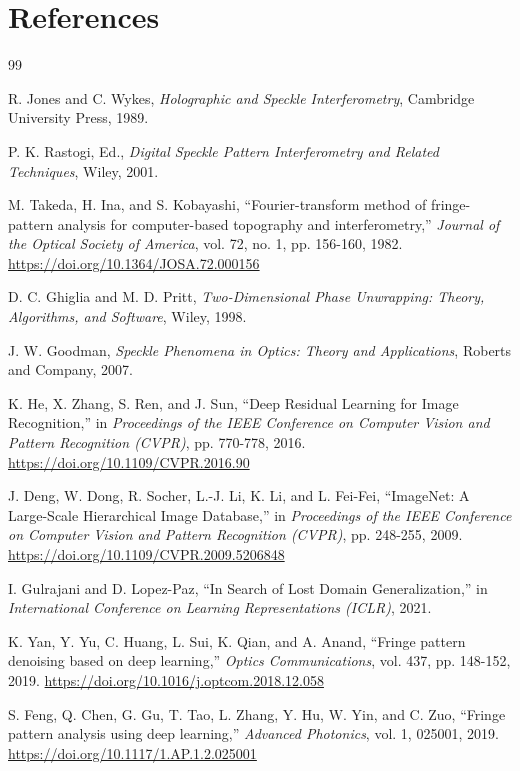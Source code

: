 \documentclass[review,3p,times]{elsarticle}
\begin{document}
\section*{References}
\begin{thebibliography}{99}

 R. Jones and C. Wykes, \emph{Holographic and Speckle Interferometry}, Cambridge University Press, 1989.

 P. K. Rastogi, Ed., \emph{Digital Speckle Pattern Interferometry and Related Techniques}, Wiley, 2001.

 M. Takeda, H. Ina, and S. Kobayashi, ``Fourier-transform method of fringe-pattern analysis for computer-based topography and interferometry,'' \emph{Journal of the Optical Society of America}, vol. 72, no. 1, pp. 156-160, 1982. \url{https://doi.org/10.1364/JOSA.72.000156}

 D. C. Ghiglia and M. D. Pritt, \emph{Two-Dimensional Phase Unwrapping: Theory, Algorithms, and Software}, Wiley, 1998.

 J. W. Goodman, \emph{Speckle Phenomena in Optics: Theory and Applications}, Roberts and Company, 2007.

 K. He, X. Zhang, S. Ren, and J. Sun, ``Deep Residual Learning for Image Recognition,'' in \emph{Proceedings of the IEEE Conference on Computer Vision and Pattern Recognition (CVPR)}, pp. 770-778, 2016. \url{https://doi.org/10.1109/CVPR.2016.90}

 J. Deng, W. Dong, R. Socher, L.-J. Li, K. Li, and L. Fei-Fei, ``ImageNet: A Large-Scale Hierarchical Image Database,'' in \emph{Proceedings of the IEEE Conference on Computer Vision and Pattern Recognition (CVPR)}, pp. 248-255, 2009. \url{https://doi.org/10.1109/CVPR.2009.5206848}

 I. Gulrajani and D. Lopez-Paz, ``In Search of Lost Domain Generalization,'' in \emph{International Conference on Learning Representations (ICLR)}, 2021.

 K. Yan, Y. Yu, C. Huang, L. Sui, K. Qian, and A. Anand, ``Fringe pattern denoising based on deep learning,'' \emph{Optics Communications}, vol. 437, pp. 148-152, 2019. \url{https://doi.org/10.1016/j.optcom.2018.12.058}

 S. Feng, Q. Chen, G. Gu, T. Tao, L. Zhang, Y. Hu, W. Yin, and C. Zuo, ``Fringe pattern analysis using deep learning,'' \emph{Advanced Photonics}, vol. 1, 025001, 2019. \url{https://doi.org/10.1117/1.AP.1.2.025001}


\end{thebibliography}
\end{document}
